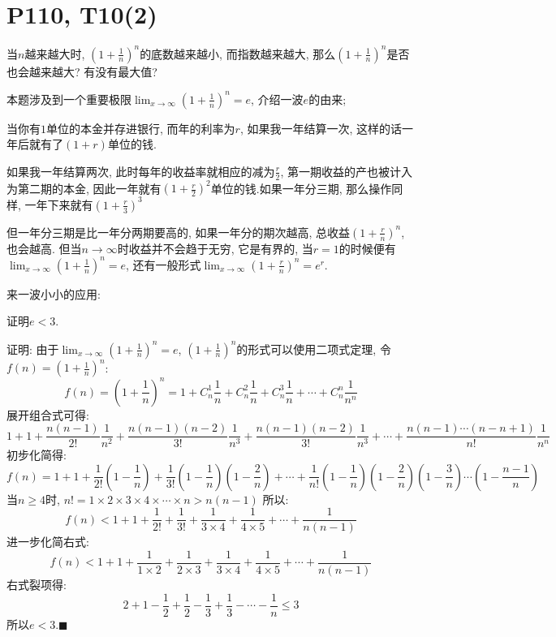 \documentclass{book}
\begin{document}
    \section{\textcolor[rgb]{0.11,0.65,0.52}{P110, T10(2)}}
    \begin{boxB}
        当$n$越来越大时, $\displaystyle (1+\frac{1}{n})^{n}$的底数越来越小, 而指数越来越大, 那么$\displaystyle (1+\frac{1}{n})^{n}$是否也会越来越大? 有没有最大值?
    \end{boxB}
    本题涉及到一个重要极限$\displaystyle \lim_{x \to \infty} (1+\frac{1}{n} )^n=e$, 介绍一波$e$的由来;

    当你有$1$单位的本金并存进银行, 而年的利率为$r$, 如果我一年结算一次, 这样的话一年后就有了$(1+r)$单位的钱.

    如果我一年结算两次, 此时每年的收益率就相应的减为$\displaystyle \frac{r}{2}$, 第一期收益的产也被计入为第二期的本金, 因此一年就有$\displaystyle (1+\frac{r}{2})^2$单位的钱.如果一年分三期, 那么操作同样, 一年下来就有$\displaystyle (1+\frac{r}{3})^3$

    但一年分三期是比一年分两期要高的, 如果一年分的期次越高, 总收益$\displaystyle (1+\frac{r}{n})^n$, 也会越高. 但当$n\to \infty$时收益并不会趋于无穷, 它是有界的, 当$r=1$的时候便有$\displaystyle \lim_{x \to \infty} (1+\frac{1}{n} )^n=e$, 还有一般形式$\displaystyle \lim_{x \to \infty} (1+\frac{r}{n} )^n=e^r$. 

    来一波小小的应用:
    \begin{boxB}
        证明$e<3$.
    \end{boxB}
    证明: 由于$\displaystyle \lim_{x \to \infty} (1+\frac{1}{n} )^n=e$, $\displaystyle (1+\frac{1}{n} )^n$的形式可以使用二项式定理, 令$\displaystyle f(n)=(1+\frac{1}{n} )^n$:
    $$
    f(n)=(1+\frac{1}{n})^n=1+C_n^1\frac{1}{n}+C_n^2\frac{1}{n}+C_n^3\frac{1}{n}+\cdots +C_n^n\frac{1}{n^n}
    $$
    展开组合式可得:
    $$
    1+1+\frac{n(n-1)}{2!}\frac{1}{n^2}+\frac{n(n-1)(n-2)}{3!}\frac{1}{n^3}+\frac{n(n-1)(n-2)}{3!}\frac{1}{n^3}+\cdots +\frac{n(n-1)\cdots (n-n+1)}{n!}\frac{1}{n^n}
    $$
    初步化简得:
    $$
    f(n)=1+1+\frac{1}{2!}(1-\frac{1}{n})+\frac{1}{3!}(1-\frac{1}{n})(1-\frac{2}{n})+\cdots +\frac{1}{n!}(1-\frac{1}{n})(1-\frac{2}{n})(1-\frac{3}{n})\cdots (1-\frac{n-1}{n})
    $$
    当$n\ge 4$时, $n!=1\times2\times3\times4\times\cdots \times n>n(n-1)$
    所以: 
    $$
    f(n)<1+1+\frac{1}{2!}+\frac{1}{3!}+\frac{1}{3\times4}+\frac{1}{4\times5}+\cdots +\frac{1}{n(n-1)}
    $$
    进一步化简右式:
    $$
    f(n)<1+1+\frac{1}{1\times2}+\frac{1}{2\times3}+\frac{1}{3\times4}+\frac{1}{4\times5}+\cdots+\frac{1}{n(n-1)}
    $$
    右式裂项得:
    $$
    2+1-\frac{1}{2}+\frac{1}{2}-\frac{1}{3}+\frac{1}{3}-\cdots-\frac{1}{n} \le 3
    $$
    所以$e<3$.$\blacksquare$
\end{document}
